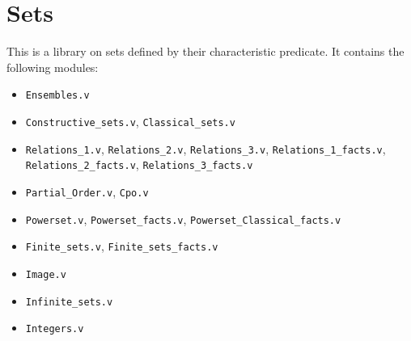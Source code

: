 \section{Sets}\label{Sets}

This is a library on sets defined by their characteristic predicate.
It contains the following modules:

\begin{itemize}
\item {\tt Ensembles.v}
\item {\tt Constructive\_sets.v}, {\tt Classical\_sets.v}
\item {\tt Relations\_1.v}, {\tt Relations\_2.v}, 
 {\tt Relations\_3.v}, {\tt Relations\_1\_facts.v},  \\
 {\tt Relations\_2\_facts.v}, {\tt Relations\_3\_facts.v}
\item {\tt Partial\_Order.v}, {\tt Cpo.v}
\item {\tt Powerset.v}, {\tt Powerset\_facts.v}, 
 {\tt Powerset\_Classical\_facts.v}
\item {\tt Finite\_sets.v}, {\tt Finite\_sets\_facts.v}
\item {\tt Image.v}
\item {\tt Infinite\_sets.v}
\item {\tt Integers.v}
\end{itemize}

